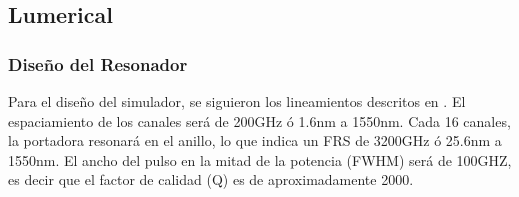 \subsection{Lumerical}

\subsubsection{Diseño del Resonador}
\label{sss:rr_design}

Para el diseño del simulador, se siguieron los lineamientos descritos en \cite{Lumerical2009}.
El espaciamiento de los canales será de 200GHz ó 1.6nm a 1550nm. Cada 16 canales,
la portadora resonará en el anillo, lo que indica un FRS de 3200GHz ó 25.6nm a 1550nm.
El ancho del pulso en la mitad de la potencia (FWHM) será de 100GHZ, es decir que
el factor de calidad (Q) es de aproximadamente 2000.



